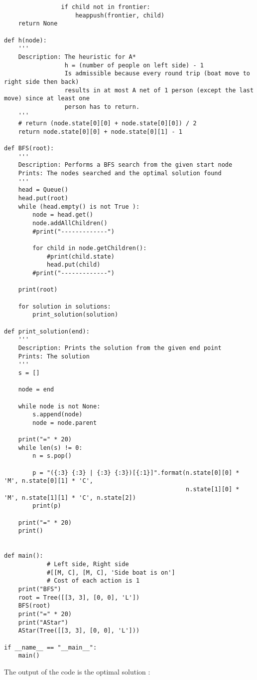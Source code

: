 \documentclass{article}
\begin{document}
\begin{verbatim}
                if child not in frontier:
                    heappush(frontier, child)
    return None

def h(node):
    '''
    Description: The heuristic for A*
                 h = (number of people on left side) - 1
                 Is admissible because every round trip (boat move to right side then back)
                 results in at most A net of 1 person (except the last move) since at least one
                 person has to return.
    '''
    # return (node.state[0][0] + node.state[0][0]) / 2
    return node.state[0][0] + node.state[0][1] - 1

def BFS(root):
    '''
    Description: Performs a BFS search from the given start node
    Prints: The nodes searched and the optimal solution found
    '''
    head = Queue()
    head.put(root)
    while (head.empty() is not True ): 
        node = head.get()
        node.addAllChildren()
        #print("-------------")
        
        for child in node.getChildren():
            #print(child.state)
            head.put(child)
        #print("-------------")

    print(root)
    
    for solution in solutions:
        print_solution(solution)
    
def print_solution(end):
    '''
    Description: Prints the solution from the given end point
    Prints: The solution
    '''
    s = []
    
    node = end

    while node is not None:
        s.append(node)
        node = node.parent

    print("=" * 20)
    while len(s) != 0:
        n = s.pop()

        p = "({:3} {:3} | {:3} {:3})[{:1}]".format(n.state[0][0] * 'M', n.state[0][1] * 'C', 
                                                   n.state[1][0] * 'M', n.state[1][1] * 'C', n.state[2])
        print(p)

    print("=" * 20)
    print()


def main():
            # Left side, Right side
            #[[M, C], [M, C], 'Side boat is on']
            # Cost of each action is 1
    print("BFS")
    root = Tree([[3, 3], [0, 0], 'L'])
    BFS(root)
    print("=" * 20)
    print("AStar")
    AStar(Tree([[3, 3], [0, 0], 'L']))

if __name__ == "__main__":
    main()
\end{verbatim}
The output of the code is the optimal solution : 
\end{document}
